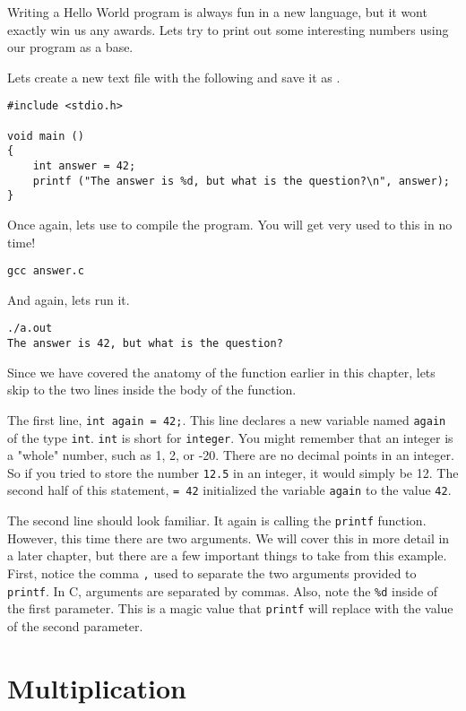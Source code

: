 Writing a Hello World program is always fun in a new language, but it wont
exactly win us any awards. Lets try to print out some interesting numbers
using our program as a base.

Lets create a new text file with the following and save it as .

\begin{Verbatim}
#include <stdio.h>

void main ()
{
    int answer = 42;
    printf ("The answer is %d, but what is the question?\n", answer);
}
\end{Verbatim}

Once again, lets use  to compile the program. You will get very
used to this in no time!

\begin{Verbatim}
gcc answer.c
\end{Verbatim}

And again, lets run it.

\begin{Verbatim}
./a.out
The answer is 42, but what is the question?
\end{Verbatim}

Since we have covered the anatomy of the  function earlier in this
chapter, lets skip to the two lines inside the body of the function.

The first line, \verb|int again = 42;|. This line declares a new variable named
\verb|again| of the type \verb|int|. \verb|int| is short for \verb|integer|.
You might remember that an integer is a "whole" number, such as 1, 2, or -20.
There are no decimal points in an integer. So if you tried to store the number
\verb|12.5| in an integer, it would simply be 12. The second half of this
statement, \verb|= 42| initialized the variable \verb|again| to the value
\verb|42|.

The second line should look familiar. It again is calling the \verb|printf|
function. However, this time there are two arguments. We will cover this in
more detail in a later chapter, but there are a few important things to take
from this example. First, notice the comma \verb|,| used to separate the
two arguments provided to \verb|printf|. In C, arguments are separated by
commas. Also, note the \verb|%d| inside of the first parameter. This is a
magic value that \verb|printf| will replace with the value of the second
parameter.

\section{Multiplication}


